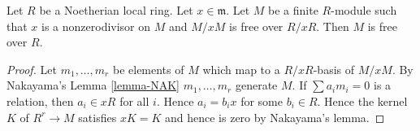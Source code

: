 \begin{lemma}
\label{lemma-free-mod-x}
Let $R$ be a Noetherian local ring.
Let $x \in \mathfrak m$.
Let $M$ be a finite $R$-module such that
$x$ is a nonzerodivisor on $M$ and
$M/xM$ is free over $R/xR$.
Then $M$ is free over $R$.
\end{lemma}

\begin{proof}
Let $m_1, \ldots, m_r$ be elements of $M$ which map to
a $R/xR$-basis of $M/xM$. By Nakayama's Lemma \ref{lemma-NAK}
$m_1, \ldots, m_r$ generate $M$. If $\sum a_i m_i = 0$
is a relation, then $a_i \in xR$ for all $i$. Hence
$a_i = b_i x$ for some $b_i \in R$. Hence
the kernel $K$ of $R^r \to M$ satisfies $xK = K$
and hence is zero by Nakayama's lemma.
\end{proof}
